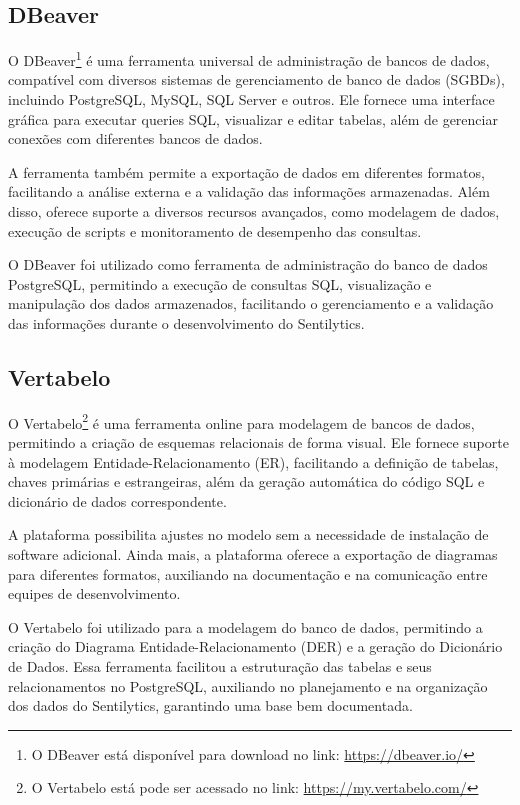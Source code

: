 \documentclass[
	12pt,				%
	oneside,			%
	a4paper,			%
	english,			%
	french,				%
	spanish,			%
	brazil				%
	]{abntex2}
\begin{document}
\hypertarget{dbeaver}{%
\subsection{DBeaver}\label{dbeaver}}

O DBeaver\footnote{O DBeaver está disponível para download no link:
  \url{https://dbeaver.io/}} é uma ferramenta universal de administração
de bancos de dados, compatível com diversos sistemas de gerenciamento de
banco de dados (SGBDs), incluindo PostgreSQL, MySQL, SQL Server e
outros. Ele fornece uma interface gráfica para executar queries SQL,
visualizar e editar tabelas, além de gerenciar conexões com diferentes
bancos de dados.

A ferramenta também permite a exportação de dados em diferentes
formatos, facilitando a análise externa e a validação das informações
armazenadas. Além disso, oferece suporte a diversos recursos avançados,
como modelagem de dados, execução de scripts e monitoramento de
desempenho das consultas.

O DBeaver foi utilizado como ferramenta de administração do banco de
dados PostgreSQL, permitindo a execução de consultas SQL, visualização e
manipulação dos dados armazenados, facilitando o gerenciamento e a
validação das informações durante o desenvolvimento do Sentilytics.

\hypertarget{vertabelo}{%
\subsection{Vertabelo}\label{vertabelo}}

O Vertabelo\footnote{O Vertabelo está pode ser acessado no link:
  \url{https://my.vertabelo.com/}} é uma ferramenta online para
modelagem de bancos de dados, permitindo a criação de esquemas
relacionais de forma visual. Ele fornece suporte à modelagem
Entidade-Relacionamento (ER), facilitando a definição de tabelas, chaves
primárias e estrangeiras, além da geração automática do código SQL e
dicionário de dados correspondente.

A plataforma possibilita ajustes no modelo sem a necessidade de
instalação de software adicional. Ainda mais, a plataforma oferece a
exportação de diagramas para diferentes formatos, auxiliando na
documentação e na comunicação entre equipes de desenvolvimento.

O Vertabelo foi utilizado para a modelagem do banco de dados, permitindo
a criação do Diagrama Entidade-Relacionamento (DER) e a geração do
Dicionário de Dados. Essa ferramenta facilitou a estruturação das
tabelas e seus relacionamentos no PostgreSQL, auxiliando no planejamento
e na organização dos dados do Sentilytics, garantindo uma base bem
documentada.
\end{document}
